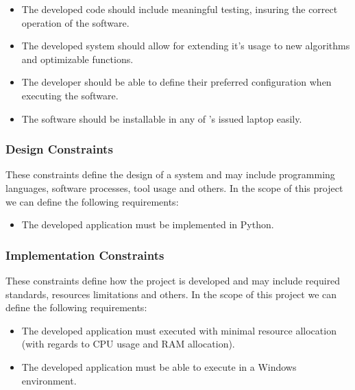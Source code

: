 \begin{itemize}
	\item The developed code should include meaningful testing, insuring the correct operation of the software.
	\item The developed system should allow for extending it's usage to new algorithms and optimizable functions.
	\item The developer should be able to define their preferred configuration when executing the software.
	\item The software should be installable in any of \faro's issued laptop easily.
\end{itemize}

\subsubsection{Design Constraints}

These constraints define the design of a system and may include programming languages, software processes, tool usage and others. In the scope of this project we can define the following requirements:


\begin{itemize}
	\item The developed application must be implemented in Python.
\end{itemize}

\subsubsection{Implementation Constraints} 

These constraints define how the project is developed and may include required standards, resources limitations and others. In the scope of this project we can define the following requirements:

\begin{itemize}
	\item The developed application must executed with minimal resource allocation (with regards to CPU usage and RAM allocation).
	\item The developed application must be able to execute in a Windows environment.
\end{itemize}


